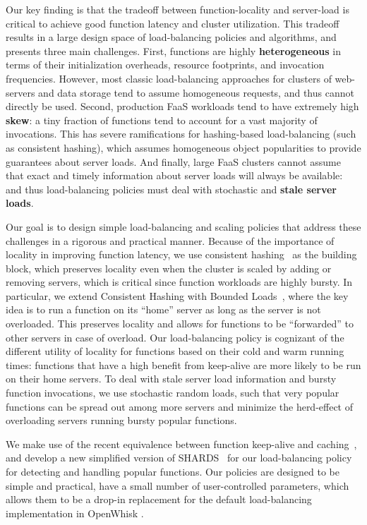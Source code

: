 Our key finding is that the tradeoff between function-locality and server-load is critical to achieve good function latency and cluster utilization.
This tradeoff results in a large design space of load-balancing policies and algorithms, and presents three main challenges.
First, functions are highly \textbf{heterogeneous} in terms of their initialization overheads, resource footprints, and invocation frequencies. 
However, most classic load-balancing approaches for clusters of web-servers and data storage tend to assume homogeneous requests, and thus cannot directly be used.
Second, production FaaS workloads tend to have extremely high \textbf{skew}: a tiny fraction of functions tend to account for a vast majority of invocations.
This has severe ramifications for hashing-based load-balancing (such as consistent hashing), which assumes homogeneous object popularities to provide guarantees about server loads.
And finally, large FaaS clusters cannot assume that exact and timely information about server loads will always be available: and thus load-balancing policies must deal with stochastic and \textbf{stale server loads}.

Our goal is to design simple load-balancing and scaling policies that address these challenges in a rigorous and practical manner.
Because of the importance of locality in improving function latency, we use consistent hashing~\cite{karger1997consistent} as the building block, which preserves locality even when the cluster is scaled by adding or removing servers, which is critical since function workloads are highly bursty. 
In particular, we extend Consistent Hashing with Bounded Loads~\cite{mirrokni2018consistent}, where the key idea is to run a function on its ``home'' server as long as the server is not overloaded.
This preserves locality and allows for functions to be ``forwarded'' to other servers in case of overload.
Our load-balancing policy is cognizant of the different utility of locality for functions based on their cold and warm running times: functions that have a high benefit from keep-alive are more likely to be run on their home servers. 
To deal with stale server load information and bursty function invocations, we use stochastic random loads, such that very popular functions can be spread out among more servers and minimize the herd-effect of overloading servers running bursty popular functions. %

We make use of the recent equivalence between function keep-alive and caching~\cite{faascache-asplos21}, and develop a new simplified version of SHARDS~\cite{shards} for our load-balancing policy for detecting and handling popular functions. 
Our policies are designed to be simple and practical, have a small number of user-controlled parameters, which allows them to be a drop-in replacement for the default load-balancing implementation in OpenWhisk \cite{openwhisk}. 

